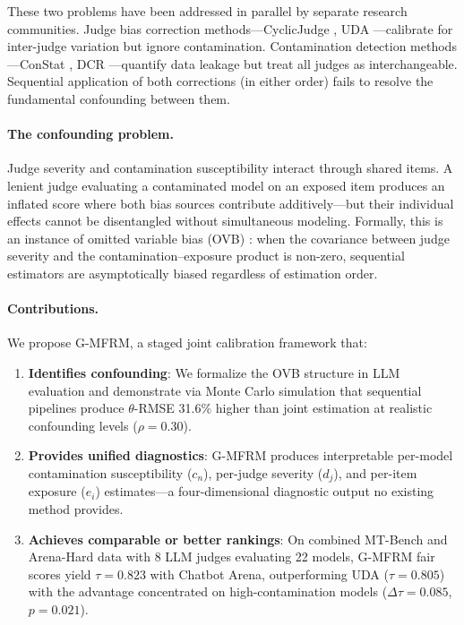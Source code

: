\documentclass[letterpaper,11pt]{article}
\begin{document}
These two problems have been addressed in parallel by separate research communities. Judge bias correction methods---CyclicJudge \citep{li2024cyclicjudge}, UDA \citep{son2024uda}---calibrate for inter-judge variation but ignore contamination. Contamination detection methods---ConStat \citep{oren2024constat}, DCR \citep{dekoninck2024dcr}---quantify data leakage but treat all judges as interchangeable. Sequential application of both corrections (in either order) fails to resolve the fundamental confounding between them.

\paragraph{The confounding problem.} Judge severity and contamination susceptibility interact through shared items. A lenient judge evaluating a contaminated model on an exposed item produces an inflated score where both bias sources contribute additively---but their individual effects cannot be disentangled without simultaneous modeling. Formally, this is an instance of omitted variable bias (OVB) \citep{angrist2009mostly}: when the covariance between judge severity and the contamination--exposure product is non-zero, sequential estimators are asymptotically biased regardless of estimation order.

\paragraph{Contributions.} We propose G-MFRM, a staged joint calibration framework that:
\begin{enumerate}
\item \textbf{Identifies confounding}: We formalize the OVB structure in LLM evaluation and demonstrate via Monte Carlo simulation that sequential pipelines produce $\theta$-RMSE 31.6\% higher than joint estimation at realistic confounding levels ($\rho = 0.30$).
\item \textbf{Provides unified diagnostics}: G-MFRM produces interpretable per-model contamination susceptibility ($c_n$), per-judge severity ($d_j$), and per-item exposure ($e_i$) estimates---a four-dimensional diagnostic output no existing method provides.
\item \textbf{Achieves comparable or better rankings}: On combined MT-Bench and Arena-Hard data with 8 LLM judges evaluating 22 models, G-MFRM fair scores yield $\tau = 0.823$ with Chatbot Arena, outperforming UDA ($\tau = 0.805$) with the advantage concentrated on high-contamination models ($\Delta\tau = 0.085$, $p = 0.021$).
\end{enumerate}
\end{document}
